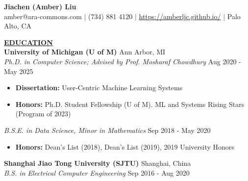\documentclass{article}
\begin{document}
\begin{center}
\thispagestyle{empty}
\huge \textbf{Jiachen (Amber) Liu \\}
\normalsize amber@ara-commons.com $\mid$ (734) 881 4120 $\mid$
\url{https://amberljc.github.io/} $\mid$ Palo Alto, CA
 \\
\hrulefill
\end{center}
\linespread{1.5}



\noindent \textbf{\underline{EDUCATION}} \\
\large \textbf{University of Michigan (U of M)} \hfill \normalsize Ann Arbor, MI \\
\textit{Ph.D. in Computer Science; Advised by Prof. Mosharaf Chowdhury}  \hfill Aug 2020 - May 2025 \\
\vspace{-1em}
\begin{itemize}
\vspace{-0.8em}
\vspace{-0.8em}
\item \textbf{Dissertation:} User-Centric Machine Learning Systems
\vspace{-0.8em}
\item \textbf{Honors:} Ph.D. Student Fellowship (U of M). ML and Systems Rising Stars (Program of 2023)
\vspace{-0.8em}

\end{itemize}
\textit{B.S.E. in Data Science, Minor in Mathematics}  \hfill Sep 2018 - May 2020 
\begin{itemize} 
\vspace{-0.8em}
  \item \textbf{Honors:} Dean's List (2018), Dean's List (2019), 2019 University Honors 
\end{itemize}
\vspace{-0.7em}
\large \textbf{Shanghai Jiao Tong University (SJTU)} \hfill \normalsize Shanghai, China \\
\vspace{-0.3em}
\textit{B.S. in Electrical Computer Engineering} \hfill \hfill Sep 2016 - Aug 2020 
\end{document}

